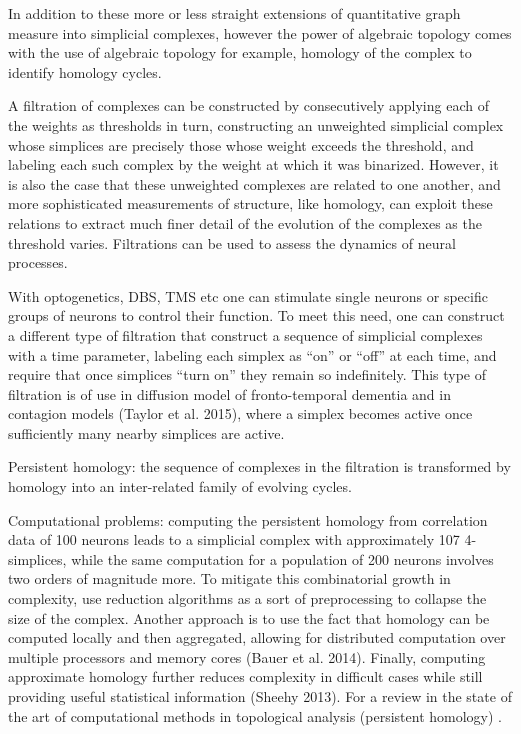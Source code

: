 \documentclass[onecollarge,runningheads]{svjour2}
\begin{document}
In addition to these more or less straight extensions of quantitative graph measure into simplicial complexes, however the power of algebraic topology comes with the use of algebraic topology for example, homology of the complex to identify homology cycles.

A filtration of complexes can be constructed by consecutively applying each of the weights as thresholds in turn, constructing an unweighted simplicial complex whose simplices are precisely those whose weight exceeds the threshold, and labeling each such complex by the weight at which it was binarized. However, it is also the case that these unweighted complexes are related to one another, and more sophisticated measurements of structure, like homology, can exploit these relations to extract much finer detail of the evolution of the complexes as the threshold varies.
Filtrations can be used to assess the dynamics of neural processes.

With optogenetics, DBS, TMS etc one can stimulate single neurons or specific groups of neurons to control their function. To meet this need, one can construct a different type of filtration \citep{taylor2015topological} that construct a sequence of simplicial complexes with a time parameter, labeling each simplex as “on” or “off” at each time, and require that once simplices “turn on” they remain so indefinitely. This type of filtration is of use in  diffusion model of fronto-temporal dementia and in contagion models (Taylor et al. 2015), where a simplex becomes active once sufficiently many nearby simplices are active.

Persistent homology:  the sequence of complexes in the filtration is transformed by homology into an inter-related family of evolving cycles.

Computational problems: computing the persistent homology from correlation data of 100 neurons leads to a simplicial complex with approximately 107 4-simplices, while the same computation for a population of 200 neurons involves two orders of magnitude more.
To mitigate this combinatorial growth in complexity, use reduction algorithms as a sort of preprocessing to collapse the size of the complex.
Another approach is to use the fact that homology can be computed locally and then aggregated, allowing for distributed computation over multiple processors and memory cores (Bauer et al. 2014). Finally, computing approximate homology further reduces complexity in difficult cases while still providing useful statistical information (Sheehy 2013). 
For a review in the state of the art of computational methods in topological analysis (persistent homology) \citep{otter2015roadmap}.
\end{document}
